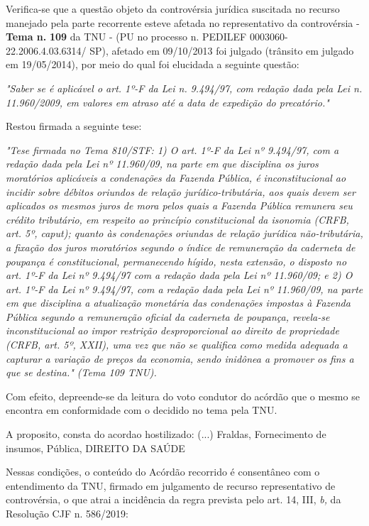 \documentclass[12pt]{article}
\begin{document}
\justifying
\noindent Verifica-se que a questão objeto da controvérsia jurídica suscitada no recurso manejado pela parte recorrente esteve afetada no representativo da controvérsia - \textbf{Tema n. }\textbf{109} da TNU - (PU no processo n. PEDILEF 0003060-22.2006.4.03.6314/ SP),  afetado em 09/10/2013 foi julgado (trânsito em julgado em 19/05/2014), por meio do qual foi elucidada a seguinte questão:

\noindent \textit{"Saber se é aplicável o art. 1º-F da Lei n. 9.494/97, com redação dada pela Lei n. 11.960/2009, em valores em atraso até a data de expedição do precatório."}

\noindent Restou firmada a seguinte tese:

\noindent \textit{"Tese firmada no Tema 810/STF: 1) O art. 1º-F da Lei nº 9.494/97, com a redação dada pela Lei nº 11.960/09, na parte em que disciplina os juros moratórios aplicáveis a condenações da Fazenda Pública, é inconstitucional ao incidir sobre débitos oriundos de relação jurídico-tributária, aos quais devem ser aplicados os mesmos juros de mora pelos quais a Fazenda Pública remunera seu crédito tributário, em respeito ao princípio constitucional da isonomia (CRFB, art. 5º, caput); quanto às condenações oriundas de relação jurídica não-tributária, a fixação dos juros moratórios segundo o índice de remuneração da caderneta de poupança é constitucional, permanecendo hígido, nesta extensão, o disposto no art. 1º-F da Lei nº 9.494/97 com a redação dada pela Lei nº 11.960/09; e 2) O art. 1º-F da Lei nº 9.494/97, com a redação dada pela Lei nº 11.960/09, na parte em que disciplina a atualização monetária das condenações impostas à Fazenda Pública segundo a remuneração oficial da caderneta de poupança, revela-se inconstitucional ao impor restrição desproporcional ao direito de propriedade (CRFB, art. 5º, XXII), uma vez que não se qualifica como medida adequada a capturar a variação de preços da economia, sendo inidônea a promover os fins a que se destina." (Tema 109 TNU).}

\noindent Com efeito, depreende-se da leitura do voto condutor do acórdão que o mesmo se encontra em conformidade com o decidido no  tema pela TNU.

\noindent A proposito, consta do acordao hostilizado: (...) Fraldas, Fornecimento de insumos, Pública, DIREITO DA SAÚDE

\noindent Nessas condições, o conteúdo do Acórdão recorrido é consentâneo com o entendimento da TNU, firmado em julgamento de recurso representativo de controvérsia, o que atrai a incidência da regra prevista pelo art. 14, III, \textit{b,} da Resolução CJF n. 586/2019:
\end{document}
